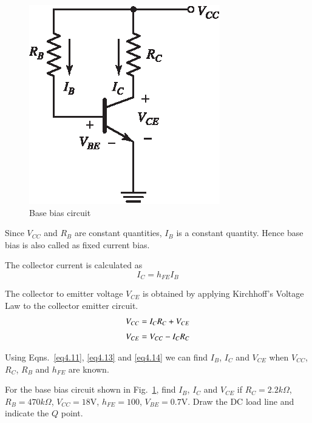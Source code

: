 \begin{figure}[H]
\centering
\includegraphics{chap3/S3-EE-03-041.eps}
\caption{Base bias circuit}\label{fig4.9}
\end{figure}

Since $V_{CC}$ and $R_{B}$ are constant quantities, $I_{B}$ is a constant quantity. Hence base bias is also called as fixed current bias.

The collector current is calculated as
\begin{equation}
I_{C}=h_{FE}I_{B}\label{eq4.13}
\end{equation}

The collector to emitter voltage $V_{CE}$ is obtained by applying Kirchhoff's Voltage Law to the collector emitter circuit.
\begin{align}
V_{CC} &= I_{C}R_{C}+V_{CE}\notag\\[3pt]
V_{CE} &= V_{CC}-I_{C}R_{C}\label{eq4.14}
\end{align}

Using Eqns.~\eqref{eq4.11}, \eqref{eq4.13} and \eqref{eq4.14} we can find $I_{B}$, $I_{C}$ and $V_{CE}$ when $V_{CC}$, $R_{C}$, $R_{B}$ and $h_{FE}$ are known.

\begin{example}\label{exam4.3}
For the base bias circuit shown in Fig.~\ref{fig4.9}, find $I_{B}$, $I_{C}$ and $V_{CE}$ if $R_{C}=2.2 k\Omega$, $R_{B}=470 k\Omega$, $V_{CC}=18\text{V}$, $h_{FE}=100$, $V_{BE}=0.7\text{V}$. Draw the DC load line and indicate the $Q$ point.
\end{example}

